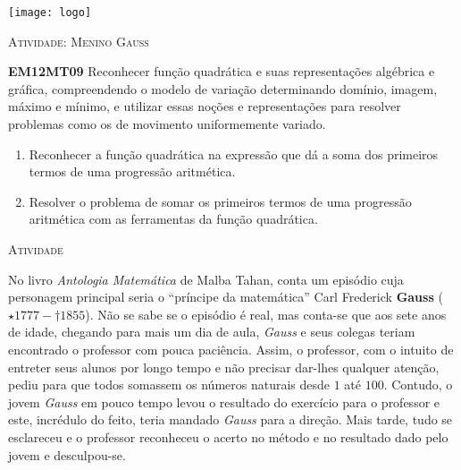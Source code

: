 \documentclass[10 pt,usenames,dvipsnames, oneside]{article}
\begin{document}
\begin{center}
  \begin{minipage}[l]{3cm}
\texttt{[image: logo]}    
\end{minipage}\hfill
\begin{minipage}[r]{.8\textwidth}
 {\Large \scshape Atividade: Menino Gauss}  
\end{minipage}
\end{center}
\vspace{.2cm}

\ifdefined\prof
\begin{objetivos}
\item \textbf{EM12MT09} Reconhecer função quadrática e suas representações algébrica e gráfica, compreendendo o
modelo de variação determinando domínio, imagem, máximo e mínimo, e utilizar essas noções e
representações para resolver problemas como os de movimento uniformemente variado.
\end{objetivos}

\begin{goals}
\begin{enumerate}
\item Reconhecer a função quadrática na expressão que dá a soma dos primeiros termos de uma progressão aritmética.
\item Resolver o problema de somar os primeiros termos de uma progressão aritmética com as ferramentas da função quadrática.
\end{enumerate}


\end{goals}

\bigskip
\begin{center}
{\large \scshape Atividade}
\end{center}
\fi

No livro \textit{Antologia Matemática} de Malba Tahan, conta um episódio cuja personagem principal seria o “príncipe da matemática” Carl Frederick \textbf{Gauss} (\(\star 1777- \dagger 1855\)). Não se sabe se o episódio é real, mas conta-se que aos sete anos de idade, chegando para mais um dia de aula, \textit{Gauss} e seus colegas teriam encontrado o professor com pouca paciência. Assim, o professor, com o intuito de entreter seus alunos por longo tempo e não precisar dar-lhes qualquer atenção, pediu para que todos somassem os números naturais desde \(1\) até \(100\). Contudo, o jovem \textit{Gauss} em pouco tempo levou o resultado do exercício para o professor e este, incrédulo do feito, teria mandado \textit{Gauss} para a direção. Mais tarde, tudo se esclareceu e o professor reconheceu o acerto no método e no resultado dado pelo jovem e desculpou-se.
\end{document}
